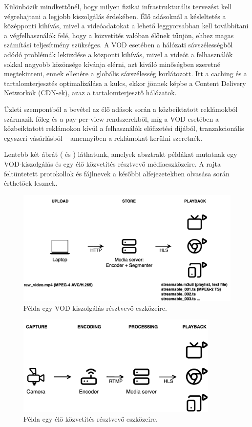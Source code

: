 Különbözik mindkettőnél, hogy milyen fizikai infrastrukturális tervezést kell végrehajtani a legjobb kiszolgálás érdekében. Élő adásoknál a késleltetés a középponti kihívás, mivel a videóadatokat a lehető leggyorsabban kell továbbítani a végfelhasználók felé, hogy a közvetítés valóban élőnek tűnjön, ehhez magas számítási teljesítmény szükséges. A VOD esetében a hálózati sávszélességből adódó problémák leküzdése a központi kihívás, mivel a videót a felhasználók sokkal nagyobb közönsége kívánja elérni, azt kiváló minőségben szeretné megtekinteni, ennek ellenére a globális sávszélesség korlátozott. Itt a caching és a tartalomterjesztés optimalizálása a kulcs, ekkor jönnek képbe a Content Delivery Networkök (CDN-ek), azaz a tartalomterjesztő hálózatok.

Üzleti szempontból a bevétel az élő adások során a közbeiktatott reklámokból származik főleg és a pay-per-view rendszerekből, míg a VOD esetében a közbeiktatott reklámokon kívül a felhasználók előfizetési díjából, tranzakcionális egyszeri vásárlásból -- amennyiben a reklámokat kerülni szeretnék.

Lentebb két ábrát ( és ) láthatunk, amelyek absztrakt példákat mutatnak egy VOD-kiszolgálás és egy élő közvetítés résztvevő médiaeszközeire. A rajta feltüntetett protokollok és fájlnevek a későbbi alfejezetekben olvasása során érthetőek lesznek.

\begin{figure}[ht]
	\centering
	\includegraphics[width=120mm, keepaspectratio]{figures/dipterv_vodsetup.png}
	\caption{Példa egy VOD-kiszolgálás résztvevő eszközeire.}
	\label{fig:vodsetup}
\end{figure}

\begin{figure}[ht]
	\centering
	\includegraphics[width=100mm, keepaspectratio]{figures/dipterv_livesetup.png}
	\caption{Példa egy élő közvetítés résztvevő eszközeire.}
	\label{fig:livesetup}
\end{figure}

